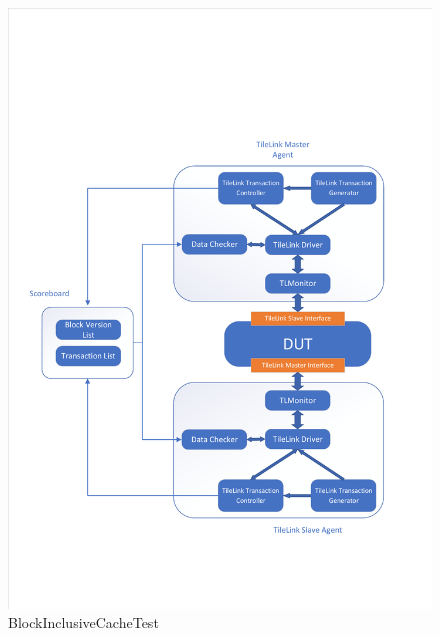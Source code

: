 \begin{figure}[H] %
\centering %
\includegraphics[width=\textwidth]{Img/BlockInclusiveCacheTest.pdf} %
\caption{BlockInclusiveCacheTest} %
\label{BlockInclusiveCacheTest} %
\end{figure}
